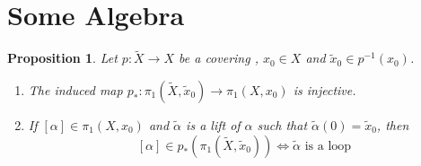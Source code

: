 \documentclass[11pt]{article}
\newtheorem{prop}[theorem]{Proposition}
\begin{document}
\section{Some Algebra}
\begin{prop}
Let $p:\widetilde{X}\to X$ be a covering , $x_0\in X$ and $\widetilde{x}_0\in p^{-1}(x_0)$.
\begin{enumerate}
	\item The induced map $p_\ast:\pi_1(\widetilde{X}, \widetilde{x}_0)\to \pi_1(X, x_0)$ is injective.
	\item If $[\alpha]\in\pi_1(X, x_0)$ and $\widetilde{\alpha}$ is a lift of $\alpha$ such that $\widetilde{\alpha}(0)=\widetilde{x}_0$, then
		\[
			[\alpha]\in p_\ast(\pi_1(\widetilde{X}, \widetilde{x}_0)) \iff \widetilde{\alpha}\text{ is a loop}
		\]
\end{enumerate}
\end{prop}
\end{document}
